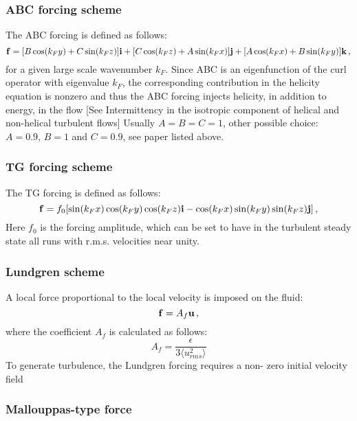 \documentclass[11pt]{article}
\begin{document}
\subsubsection{ABC forcing scheme}
The ABC forcing is defined as follows:
\begin{equation}
{\bf f} = [B \cos (k_F y) + C \sin (k_F z) ]{\bf i} \\ + [C \cos (k_F z)+ A \sin (k_F x) ]{\bf j} + [A \cos (k_F x) + B \sin (k_F y)] {\bf k}\, ,
\end{equation}
for a given large scale wavenumber $k_F$. 
Since ABC is an eigenfunction of the curl operator with eigenvalue $k_F$, the corresponding contribution in the helicity equation is nonzero and thus the ABC forcing injects helicity, in addition to energy, in the flow [See Intermittency in the isotropic component of helical and non-helical turbulent flows]
Usually $A=B=C=1$, other possible choice: $A=0.9$, $B=1$ and $C=0.9$, see paper listed above.

\subsubsection{TG forcing scheme}
The TG forcing is defined as follows:
\begin{equation}
{\bf f} = f_0 [ \sin (k_F x)  \cos (k_F y) \cos(k_F z) {\bf i}  - \cos (k_F x) \sin (k_F y) \sin (k_F z) {\bf j}] \, ,
\end{equation}
Here $f_0$ is the forcing amplitude, which can be set to have in the turbulent steady state all runs with r.m.s. velocities near unity.

\subsubsection{Lundgren scheme}
A local force proportional to the local velocity is imposed on the fluid:
\begin{equation}
{\bf f} = A_f {\bf u}\, ,
\end{equation}
where the coefficient $A_f$ is calculated as follows:
\begin{equation}
A_f = \frac{\epsilon}{3 \langle u_{rms}^2 \rangle }
\end{equation}
To generate turbulence, the Lundgren forcing requires a non- zero initial velocity field



\subsubsection{Mallouppas-type force}
\end{document}
